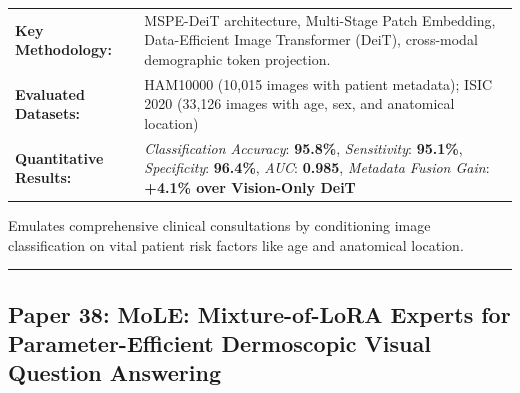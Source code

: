 \documentclass[10pt,a4paper]{article}
\begin{document}
\vspace{4pt}
\begin{tabularx}{\linewidth}{p{3.2cm}X}
\toprule
\textbf{Key Methodology:} & MSPE-DeiT architecture, Multi-Stage Patch Embedding, Data-Efficient Image Transformer (DeiT), cross-modal demographic token projection. \\
\textbf{Evaluated Datasets:} & HAM10000 (10,015 images with patient metadata); ISIC 2020 (33,126 images with age, sex, and anatomical location) \\
\textbf{Quantitative Results:} & \textit{Classification Accuracy}: \textbf{95.8\%}, \textit{Sensitivity}: \textbf{95.1\%}, \textit{Specificity}: \textbf{96.4\%}, \textit{AUC}: \textbf{0.985}, \textit{Metadata Fusion Gain}: \textbf{+4.1\% over Vision-Only DeiT} \\
\bottomrule
\end{tabularx}
\vspace{4pt}
\begin{tcolorbox}[utilitybox,title=Clinical Utility and Real-World Impact]
Emulates comprehensive clinical consultations by conditioning image classification on vital patient risk factors like age and anatomical location.
\end{tcolorbox}
\vspace{12pt}
\hrule
\vspace{12pt}
\subsection*{Paper 38: MoLE: Mixture-of-LoRA Experts for Parameter-Efficient Dermoscopic Visual Question Answering}
\end{document}
